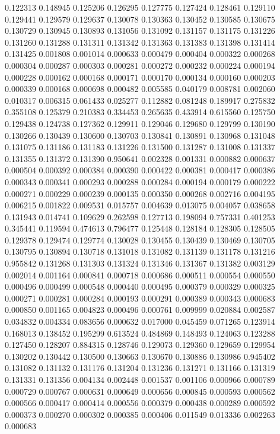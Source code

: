 0.122313
0.148945
0.125206
0.126295
0.127775
0.127424
0.128461
0.129110
0.129441
0.129579
0.129637
0.130078
0.130363
0.130452
0.130585
0.130675
0.130729
0.130945
0.130893
0.131056
0.131092
0.131157
0.131175
0.131226
0.131260
0.131288
0.131311
0.131342
0.131363
0.131383
0.131398
0.131414
0.131425
0.001808
0.001014
0.000633
0.000479
0.000404
0.000322
0.000268
0.000304
0.000287
0.000303
0.000281
0.000272
0.000232
0.000224
0.000194
0.000228
0.000162
0.000168
0.000171
0.000170
0.000134
0.000160
0.000203
0.000339
0.000168
0.000698
0.000482
0.005585
0.040179
0.008781
0.002060
0.010317
0.006315
0.061433
0.025277
0.112882
0.081248
0.189917
0.275832
0.355108
0.125379
0.210383
0.334453
0.265635
0.433914
0.615560
0.125750
0.129438
0.124738
0.127362
0.129911
0.129046
0.129680
0.129799
0.130190
0.130266
0.130439
0.130600
0.130703
0.130841
0.130891
0.130968
0.131048
0.131075
0.131186
0.131183
0.131226
0.131500
0.131287
0.131008
0.131337
0.131355
0.131372
0.131390
0.950641
0.002328
0.001331
0.000882
0.000637
0.000504
0.000392
0.000384
0.000390
0.000422
0.000381
0.000417
0.000386
0.000343
0.000341
0.000293
0.000288
0.000284
0.000194
0.000179
0.000222
0.000271
0.000229
0.000239
0.000135
0.000350
0.000268
0.002716
0.004195
0.006215
0.001822
0.009531
0.015757
0.004639
0.013075
0.004057
0.038658
0.131943
0.014741
0.109629
0.262598
0.127713
0.198094
0.757331
0.401253
0.345441
0.119594
0.474613
0.796477
0.125448
0.128184
0.128305
0.128505
0.129378
0.129474
0.129774
0.130028
0.130455
0.130439
0.130469
0.130705
0.130795
0.130894
0.130718
0.131018
0.131082
0.131139
0.131178
0.131216
0.955842
0.131268
0.131303
0.131324
0.131346
0.131367
0.131382
0.003129
0.002014
0.001164
0.000841
0.000718
0.000686
0.000511
0.000554
0.000550
0.000496
0.000499
0.000548
0.000440
0.000495
0.000379
0.000329
0.000325
0.000271
0.000281
0.000284
0.000193
0.000291
0.000389
0.000343
0.000683
0.000850
0.001165
0.004823
0.000496
0.000761
0.009999
0.020884
0.002587
0.034832
0.004334
0.083656
0.000632
0.017000
0.045459
0.071265
0.123914
0.168013
0.138452
0.195299
0.613524
0.484869
0.148493
0.124063
0.123288
0.127450
0.128207
0.884315
0.128746
0.129073
0.129360
0.129659
0.129954
0.130202
0.130442
0.130500
0.130663
0.130670
0.130886
0.130986
0.945402
0.131082
0.131132
0.131176
0.131204
0.131236
0.131271
0.131166
0.131319
0.131331
0.131356
0.004134
0.002448
0.001537
0.001106
0.000966
0.000789
0.000729
0.000767
0.000631
0.000649
0.000656
0.000845
0.000593
0.000562
0.000566
0.000417
0.000414
0.000556
0.000379
0.000438
0.000289
0.000592
0.000373
0.000270
0.000302
0.000385
0.000406
0.011549
0.013336
0.002263
0.000683
